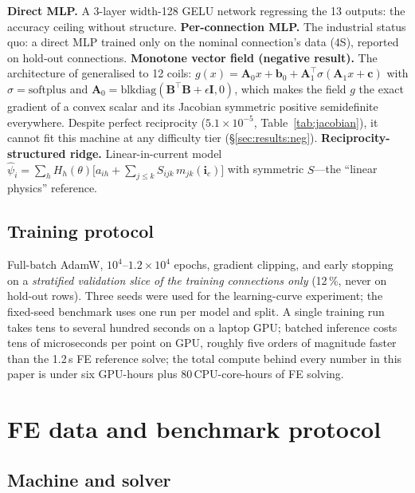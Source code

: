 \documentclass[review]{elsarticle}
\newcommand{\ic}{\boldsymbol{i}_c}
\begin{document}
\textbf{Direct MLP.} A 3-layer width-128 GELU network regressing the 13
outputs: the accuracy ceiling without structure.
\textbf{Per-connection MLP.} The industrial status quo: a direct MLP trained
only on the nominal connection's data (4S), reported on hold-out connections.
\textbf{Monotone vector field (negative result).} The architecture of
\cite{Li2026GradNet} generalised to 12 coils:
$g(x)=\mathbf{A}_0x+\boldsymbol{b}_0+\mathbf{A}_1^{\!\top}\sigma(\mathbf{A}_1x+\boldsymbol{c})$
with $\sigma=\mathrm{softplus}$ and
$\mathbf{A}_0=\mathrm{blkdiag}(\mathbf{B}^{\!\top}\mathbf{B}+\epsilon\mathbf{I},0)$,
which makes the field $g$ the exact gradient of a convex scalar and its
Jacobian symmetric positive semidefinite everywhere. Despite perfect
reciprocity ($5.1\times10^{-5}$, Table~\ref{tab:jacobian}), it cannot fit
this machine at any difficulty tier (\S\ref{sec:results:neg}).
\textbf{Reciprocity-structured ridge.} Linear-in-current model
$\hat{\psi}_i=\sum_h H_h(\theta)\big[a_{ih}+\sum_{j\le
k}S_{ijk}\,m_{jk}(\ic)\big]$ with symmetric $S$---the ``linear physics''
reference.

\subsection{Training protocol}

Full-batch AdamW, $10^4$--$1.2\times10^4$ epochs, gradient clipping, and
early stopping on a \emph{stratified validation slice of the training
connections only} (12\,\%, never on hold-out rows). Three seeds were used
for the learning-curve experiment; the fixed-seed benchmark uses one run
per model and split. A single training run takes tens to several hundred
seconds on a laptop GPU; batched inference
costs tens of microseconds per point on GPU, roughly five orders of
magnitude faster than the 1.2\,s FE reference solve; the total
compute behind every number in this paper is under six GPU-hours plus 80\,CPU-core-hours
of FE solving.

\section{FE data and benchmark protocol}
\label{sec:benchmark}

\subsection{Machine and solver}
\end{document}
